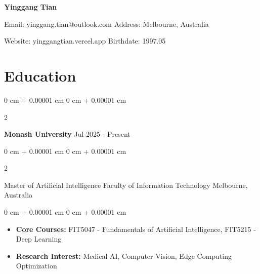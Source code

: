 \documentclass[10pt, a4paper]{article}
\newenvironment{highlights}{
    \begin{itemize}[
        topsep=0.15 cm,
        parsep=0.08 cm,
        partopsep=0pt,
        itemsep=0.05 cm,
        leftmargin=0 cm + 10pt
    ]
}{
    \end{itemize}
} %
\newenvironment{onecolentry}{
    \begin{adjustwidth}{
        0 cm + 0.00001 cm
    }{
        0 cm + 0.00001 cm
    }
}{
    \end{adjustwidth}
} %
\newenvironment{twocolentry}[2][]{
    \onecolentry
    \def\secondColumn{#2}
    \setcolumnwidth{\fill, 4.5 cm}
    \begin{paracol}{2}
}{
    \switchcolumn \raggedleft \secondColumn
    \end{paracol}
    \endonecolentry
} %
\newenvironment{header}{
    \setlength{\topsep}{0pt}\par\kern\topsep\centering\linespread{1.5}
}{
    \par\kern\topsep
} %
\begin{document}
    \setlength{\baselineskip}{1.2\baselineskip}
    \justifying
    
    \newcommand{\AND}{\unskip
        \cleaders\copy\ANDbox\hskip\wd\ANDbox
        \ignorespaces
    }
    \newsavebox\ANDbox
    \sbox\ANDbox{$|$}


    \begin{header}
        \vspace{0.5cm}
        \centering
        \fontsize{24 pt}{24 pt}\selectfont \textbf{Yinggang Tian}
        
        \vspace{0.4cm}
        
        \fontsize{10 pt}{12 pt}\selectfont
        Email: yinggang.tian@outlook.com \textbar{} Address: Melbourne, Australia
        
        \vspace{0.1cm}
        Website: yinggangtian.vercel.app \textbar{} Birthdate: 1997.05
    \end{header}

    \vspace{5 pt - 0.3 cm}

    \section{Education}

        \begin{twocolentry}{
            Jul 2025 - Present
        }
            \textbf{Monash University}\end{twocolentry}

        \begin{twocolentry}{
            Melbourne, Australia
        }
            Master of Artificial Intelligence Faculty of Information Technology\end{twocolentry}

        \vspace{0.10 cm}
        \begin{onecolentry}
            \begin{highlights}
                \item \textbf{Core Courses:} FIT5047 - Fundamentals of Artificial Intelligence, FIT5215 - Deep Learning
                \item \textbf{Research Interest:} Medical AI, Computer Vision, Edge Computing Optimization
            \end{highlights}
        \end{onecolentry}
\end{document}

